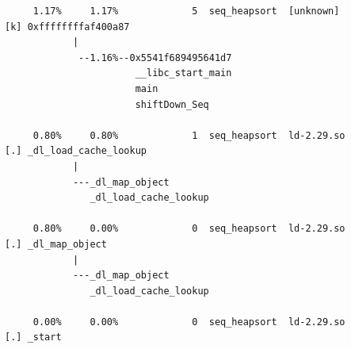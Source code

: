 \documentclass{article}
\begin{document}
\begin{verbatim}
     1.17%     1.17%             5  seq_heapsort  [unknown]         [k] 0xffffffffaf400a87
            |
             --1.16%--0x5541f689495641d7
                       __libc_start_main
                       main
                       shiftDown_Seq

     0.80%     0.80%             1  seq_heapsort  ld-2.29.so        [.] _dl_load_cache_lookup
            |
            ---_dl_map_object
               _dl_load_cache_lookup

     0.80%     0.00%             0  seq_heapsort  ld-2.29.so        [.] _dl_map_object
            |
            ---_dl_map_object
               _dl_load_cache_lookup

     0.00%     0.00%             0  seq_heapsort  ld-2.29.so        [.] _start
\end{verbatim}
\normalsize
\end{document}
